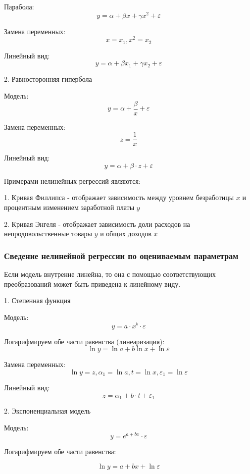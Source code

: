\documentclass[aps,%
12pt,%
final,%
oneside,
onecolumn,%
musixtex, %
superscriptaddress,%
centertags]{article} %
\begin{document}
Парабола:
$$y = \alpha+ \beta x+\gamma x^2+\varepsilon$$

Замена переменных:
$$ x = x_1, x^2 = x_2 $$

Линейный вид:
$$ y = \alpha+ \beta x_1+\gamma x_2 +\varepsilon $$
\newpage

\begin{center} 2. Равносторонняя гипербола \end{center}

Модель:
$$y = \alpha+\frac{\beta}{x}+\varepsilon$$

Замена переменных:
$$ z = \frac{1}{x} $$

Линейный вид:
$$y = \alpha+ \beta \cdot z+\varepsilon$$

Примерами нелинейных регрессий являются:

1. Кривая Филлипса - отображает зависимость между уровнем безработицы $x$ и процентным изменением заработной платы $y$ 

2. Кривая Энгеля - отображает зависимость доли расходов на непродовольственные товары $y$ и общих доходов $x$

\subsubsection{Сведение нелинейной регрессии по оцениваемым параметрам}

Если модель внутренне линейна, то она с помощью соответствующих преобразований может быть приведена к линейному виду.

\begin{center} 1. Степенная функция \end{center}

Модель:
$$ y = a \cdot x^b \cdot \varepsilon $$

Логарифмируем обе части равенства (линеаризация):
$$ \ln y =\ln a + b\ln x + \ln \varepsilon $$

Замена переменных:
$$ \ln y = z, \alpha_1 = \ln a, t = \ln x, \varepsilon_1 = \ln \varepsilon $$

Линейный вид:
$$ z =\alpha_1 + b \cdot t + \varepsilon_1 $$

\begin{center} 2. Экспоненциальная модель \end{center}

Модель:
$$ y = e^{a+bx} \cdot \varepsilon $$

Логарифмируем обе части равенства:

$$ \ln y = a + bx + \ln \varepsilon$$
\end{document}
